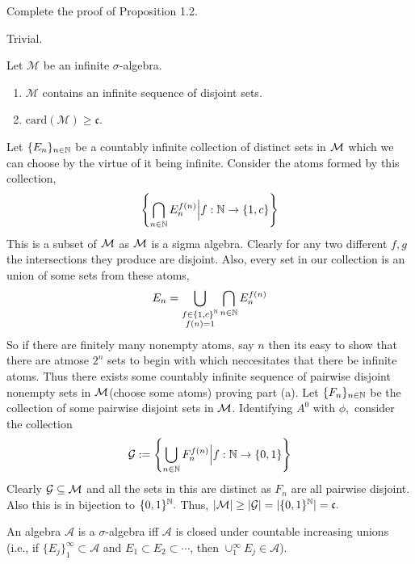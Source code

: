 \documentclass[12pt,a4paper]{article}
\begin{document}
\begin{problem}\label{prob:1-2}
Complete the proof of Proposition 1.2.
\end{problem}
\begin{solution}
    Trivial.
\end{solution}
\begin{problem}\label{prob:1-3}
Let $\mathcal{M}$ be an infinite $\sigma$-algebra.
\begin{enumerate}[label=\alph*.]
    \item $\mathcal{M}$ contains an infinite sequence of disjoint sets.
    \item $\text{card}(\mathcal{M}) \ge \mathfrak{c}$.
\end{enumerate}
\end{problem}
\begin{solution}
    Let $\{E_n\}_{n\in\mathbb{N}}$ be a countably infinite collection of distinct sets in $\mathcal{M}$ which we can choose by the virtue of it being infinite. Consider the atoms formed by this collection, 
    $$\left\{\bigcap_{n\in\mathbb{N}}E_n^{f(n)}\Big\vert f:\mathbb{N}\to\{1,c\}\right\}$$
    This is a subset of $\mathcal{M}$ as $\mathcal{M}$ is a sigma algebra. 
    Clearly for any two different $f,g$ the intersections they produce are disjoint. Also, every set in our collection is an union of some sets from these atoms,
    $$E_n=\bigcup_{\substack{f\in\{1,c\}^{\mathbb{N}}\\ f(n)=1}}\bigcap_{n\in\mathbb{N}}E_n^{f(n)}$$
    So if there are finitely many nonempty atoms, say $n$ then its easy to show that there are atmose $2^n$ sets to begin with which neccesitates that there be infinite atoms. 
    Thus there exists some countably infinite sequence of pairwise disjoint nonempty sets in $\mathcal{M}$(choose some atoms) proving part (a). 
    Let $\{F_n\}_{n\in\mathbb{N}}$ be the collection of some pairwise disjoint sets in $\mathcal{M}$. 
    Identifying $A^0$ with $\phi,$ consider the collection
    $$\mathcal G:=\left\{\bigcup_{n\in\mathbb{N}}F_n^{f(n)}\Big\vert f:\mathbb{N}\to\{0,1\}\right\}$$
    Clearly $\mathcal G\subseteq\mathcal{M}$ and all the sets in this are distinct as $F_n$ are all pairwise disjoint. 
    Also this is in bijection to $\{0,1\}^{\mathbb{N}}.$ 
    Thus, $|\mathcal{M}|\geq|\mathcal G|=|\{0,1\}^{\mathbb{N}}|=\mathfrak c.$
\end{solution}
\begin{problem}\label{prob:1-4}
An algebra $\mathcal{A}$ is a $\sigma$-algebra iff $\mathcal{A}$ is closed under countable increasing unions (i.e., if $\{E_j\}_{1}^{\infty} \subset \mathcal{A}$ and $E_1 \subset E_2 \subset \cdots$, then $\cup_{1}^{\infty} E_j \in \mathcal{A}$).
\end{problem}
\end{document}
